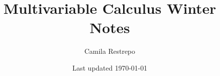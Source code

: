 \documentclass{notes}
\title{\bfseries Multivariable Calculus Winter Notes}
\author{Camila Restrepo}
\date{Last updated \today}
\begin{document}
\maketitle
\toccontents
\frontpagewarning



\end{document}
